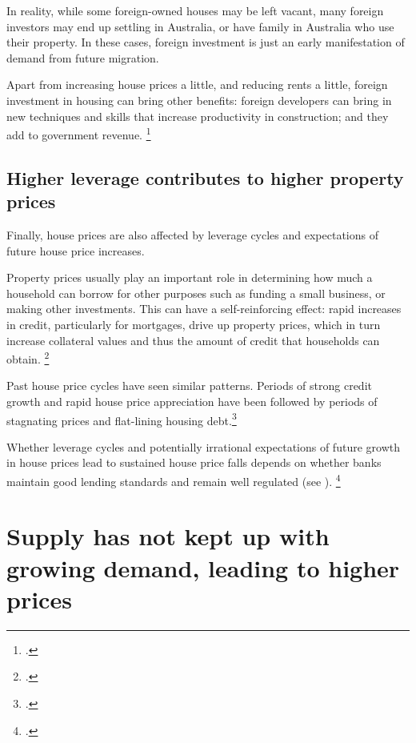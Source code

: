 In reality, while some foreign-owned houses may be left vacant, many foreign investors may end up settling in Australia, or have family in Australia who use their property.
In these cases, foreign investment is just an early manifestation of demand from future migration.

Apart from increasing house prices a little, and reducing rents a little, foreign investment in housing can bring other benefits: foreign developers can bring in new techniques and skills that increase productivity in construction; and they add to government revenue.%
	\footcites{FairerAccess2017MorrisonMediaRelease}{ACIL2017Property}

\subsection{Higher leverage contributes to higher property prices}\label{subsec:financial-cycles-affect-housing}

Finally, house prices are also affected by leverage cycles and expectations of future house price increases.

Property prices usually play an important role in determining how much a household can borrow for other purposes such as funding a small business, or making other investments.
This can have a self-reinforcing effect: rapid increases in credit, particularly for mortgages, drive up property prices, which in turn increase collateral values and thus the amount of credit that households can obtain.%
    \footcites{NBER-Credit-Supply-and-House-Prices}{Bernanke-Gertler-credit-channel-1995}

Past house price cycles have seen similar patterns. Periods of strong credit growth and rapid house price appreciation have been followed by periods of stagnating prices and flat-lining housing debt.\footcite{Daley-Coates-Wiltshire-2017-InsideStory-What-comes-after-housing-boom} 

Whether leverage cycles and potentially irrational expectations of future growth in house prices lead to sustained house price falls depends on whether banks maintain good lending standards and remain well regulated (see ).%
    \footcite[][]{Glaeser-2013-Natio-of-gamblers}

\section{Supply has not kept up with growing demand, leading to higher prices}\label{sec:supply-has-not-kept-up-with-growing-demand}

